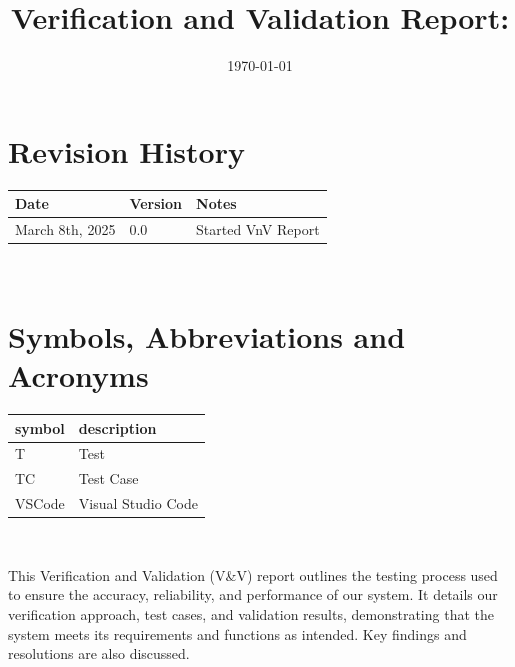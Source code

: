 \documentclass[12pt, titlepage]{article}
\begin{document}
\title{Verification and Validation Report: \progname}
\author{\authname}
\date{\today}

\maketitle


\section*{Revision History}

\begin{tabularx}{\textwidth}{p{3cm}p{2cm}X}
  \toprule {\bf Date} & {\bf Version} & {\bf Notes}\\
  \midrule
  March 8th, 2025 & 0.0 & Started VnV Report\\
  \bottomrule
\end{tabularx}

~\newpage

\section*{Symbols, Abbreviations and Acronyms}

\renewcommand{\arraystretch}{1.2}
\begin{tabular}{l l}
  \toprule
  \textbf{symbol} & \textbf{description}\\
  \midrule
  T & Test\\
  TC & Test Case\\
  VSCode & Visual Studio Code\\
  \bottomrule
\end{tabular}\\


\newpage

\tableofcontents

\listoftables %

\listoffigures %

\newpage


This Verification and Validation (V\&V) report outlines the testing
process used to ensure the accuracy, reliability, and performance of
our system. It details our verification approach, test cases, and
validation results, demonstrating that the system meets its
requirements and functions as intended. Key findings and resolutions
are also discussed.
\end{document}
